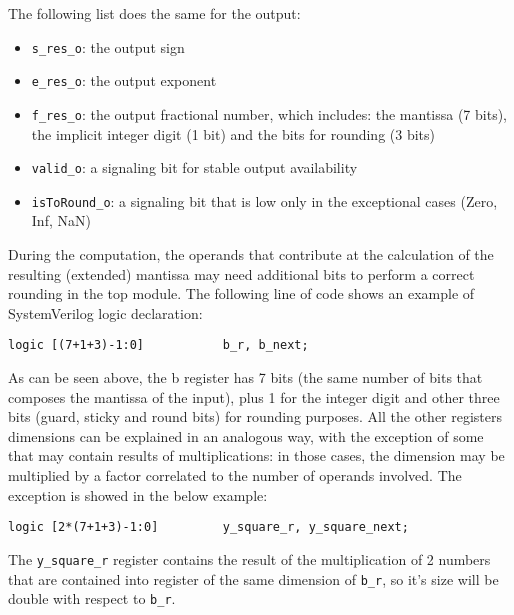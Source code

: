 \documentclass[paper=letter, fontsize=12pt]{article}
\begin{document}
The following list does the same for the output:
\begin{itemize}
    \item \texttt{s\_res\_o}: the output sign
    \item \texttt{e\_res\_o}: the output exponent
    \item \texttt{f\_res\_o}: the output fractional number, which includes: the mantissa (7 bits), the implicit integer digit (1 bit) and the bits for rounding (3 bits)
    \item \texttt{valid\_o}: a signaling bit for stable output availability
    \item \texttt{isToRound\_o}: a signaling bit that is low only in the exceptional cases (Zero, Inf, NaN)
\end{itemize}
During the computation, the operands that contribute at the calculation of the resulting (extended) mantissa may need additional bits to perform a correct rounding in the top module. The following line of code shows an example of SystemVerilog logic declaration:
\begin{lstlisting}
logic [(7+1+3)-1:0]           b_r, b_next;
\end{lstlisting}
As can be seen above, the b register has 7 bits (the same number of bits that composes the mantissa of the input), plus 1 for the integer digit and other three bits (guard, sticky and round bits) for rounding purposes. All the other registers dimensions can be explained in an analogous way, with the exception of some that may contain results of multiplications: in those cases, the dimension may be multiplied by a factor correlated to the number of operands involved. The exception is showed in the below example:
\begin{lstlisting}
logic [2*(7+1+3)-1:0]         y_square_r, y_square_next;
\end{lstlisting}
The \texttt{y\_square\_r} register contains the result of the multiplication of 2 numbers that are contained into register of the same dimension of \texttt{b\_r}, so it's size will be double with respect to \texttt{b\_r}.
\end{document}
